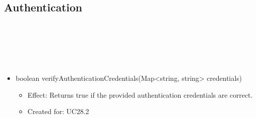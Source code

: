   \subsection{Authentication}\label{int:OtherDataDatabaseOtherDataDBAuthentication}
    \begin{description}
      \item[Provided by:] \iconcomponent{}~
      \item[Required by:] \iconcomponent{}~
      \item[Operations:] ~
    \begin{itemize}[noitemsep,nolistsep,leftmargin=-.25cm]
      \item \textsf{boolean verifyAuthenticationCredentials(Map\textless{}string, string\textgreater{} credentials)}
        \begin{itemize}[noitemsep,nolistsep]
           \item Effect: Returns true if the provided authentication credentials are correct.
\item Created for: UC28.2
        \end{itemize}
    \end{itemize}
    \end{description}

